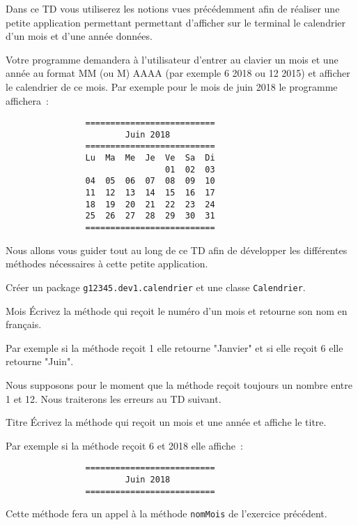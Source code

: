 \documentclass[a4paper,11pt]{article}
\date{2018 -- 2019}
\begin{document}
\entete
\titre
{}
\lastedit


	Dans ce TD vous utiliserez les notions vues précédemment afin de réaliser 
	une petite application permettant permettant d'afficher sur le terminal 
	le calendrier d'un mois et d'une année données. 
	
	Votre programme demandera à l'utilisateur d'entrer au clavier un mois et une année 
au format MM (ou M) AAAA (par exemple 6 2018 ou 12 2015) et afficher le calendrier de ce mois.
Par exemple pour le mois de juin 2018 le programme affichera~: 

\begin{verbatim}
                ==========================
                        Juin 2018
                ========================== 
                Lu  Ma  Me  Je  Ve  Sa  Di
                                01  02  03   
                04  05  06  07  08  09  10   
                11  12  13  14  15  16  17   
                18  19  20  21  22  23  24   
                25  26  27  28  29  30  31      
                ==========================
\end{verbatim}

\vspace{0.5cm}


Nous allons vous guider tout au long de ce TD afin de développer les différentes méthodes nécessaires à cette petite application.


		Créer un package \texttt{g12345.dev1.calendrier} et une classe \texttt{Calendrier}.


 	\begin{Exercice}{Mois}
		\'Ecrivez la méthode  qui reçoit le numéro d'un mois et retourne son nom en français.
		
		Par exemple si la méthode reçoit 1 elle retourne "Janvier" et si elle reçoit 6 elle retourne "Juin".
		
		Nous supposons pour le moment que la méthode reçoit toujours un nombre entre 1 et 12.
		Nous traiterons les erreurs au TD suivant.
	\end{Exercice} 

 
 	\begin{Exercice}{Titre}
		\'Ecrivez la méthode  qui reçoit un mois et une année
		et affiche le titre. 
		
		Par exemple si la méthode reçoit 6 et 2018 elle affiche~:
		\begin{verbatim}
                ==========================
                        Juin 2018
                ========================== 
		\end{verbatim}	
		
		Cette méthode fera un appel à la méthode \texttt{nomMois} de l'exercice précédent.
	\end{Exercice} 
\end{document}
